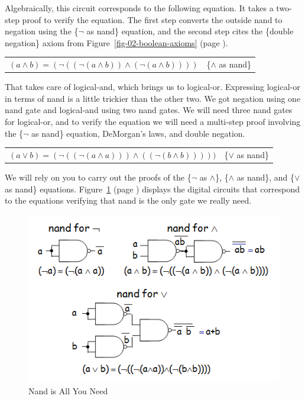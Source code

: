 Algebraically, this circuit corresponds to the following equation.
It takes a two-step proof to verify the equation.
The first step converts the outside nand to negation using the
\{$\neg$ as nand\} equation, and the second step cites
the \{double negation\} axiom from Figure~\ref{fig-02-boolean-axioms}
(page \pageref{fig-02-boolean-axioms}).

\begin{center}
\begin{tabular}{ll}
$(a \wedge b) = (\neg ((\neg (a \wedge b)) \wedge (\neg (a \wedge b))))$ & \{$\wedge$ as nand\}\label{and-as-nand}
\end{tabular}
\end{center}

That takes care of logical-and, which brings us to logical-or.
Expressing logical-or in terms of nand is a little trickier
than the other two.
We got negation using one nand gate and
logical-and using two nand gates.
We will need three nand gates for logical-or,
and to verify the equation we will need a multi-step proof involving
the \{$\neg$ as nand\} equation, DeMorgan's laws,
and double negation.

\begin{center}
\begin{tabular}{ll}
$(a \vee b) = (\neg ((\neg(a \wedge a))) \wedge ((\neg(b \wedge b)))))$ & \{$\vee$ as nand\}\label{or-as-nand}
\end{tabular}
\end{center}

We will rely on you to carry out the proofs of the
\{$\neg$ as $\wedge$\}, \{$\wedge$ as nand\}, and \{$\vee$ as nand\} equations.
Figure~\ref{fig-02-nand-is-all-you-need} (page \pageref{fig-02-nand-is-all-you-need})
displays the digital circuits that
correspond to the equations verifying that nand is the only gate we really need.

\begin{figure}
\begin{center}
\includegraphics[scale=0.7]{Resources/NandIsAllYouNeed.png}
\end{center}
\caption{Nand is All You Need}
\label{fig-02-nand-is-all-you-need}
\end{figure}

